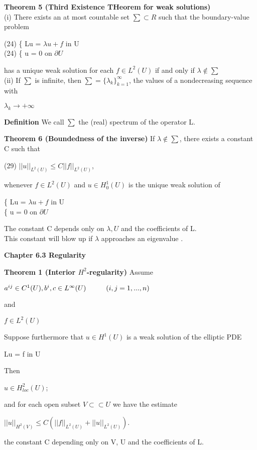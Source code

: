\documentclass{article}
\newcommand\tab[1][1cm]{\hspace*{#1}}
\begin{document}
\textbf {Theorem 5 (Third Existence THeorem for weak solutions) } \\
\tab (i) There exists an at most countable set $\sum \subset R$ such that the boundary-value problem 
\begin{center}
(24) \tab \{ Lu = $\lambda u + f$ \tab in U \\
(24) \tab \{ u = 0 \tab on $\partial U$
\end{center}
has a unique weak solution for each $f \in L^2(U)$ if and only if $\lambda \notin \sum$ \\ (ii) If $\sum$ is infinite, then $\sum = \{\lambda_k\}_{k=1}^{\infty}$, the values of a nondecreasing sequence with 
\begin{center}
$\lambda_k \to + \infty$
\end{center}

\textbf {Definition} We call $\sum$ the (real) spectrum of the operator L.

\textbf {Theorem 6 (Boundedness of the inverse)} If $\lambda \notin \sum$, there exists a constant C such that 
\begin{center}
(29) \tab $||u||_{L^{2}(U)} \leq C||f||_{L^{2}(U)}$,
\end{center}
whenever $f \in L^2(U)$ and $u \in H_0^{1}(U)$ is the unique weak solution of
\begin{center}
\{ Lu = $\lambda u + f$ \tab in U \\
\{ u = 0 \tab on $\partial U$
\end{center}
The constant C depends only on $\lambda, U$ and the coefficients of L. \\
This constant will blow up if $\lambda$ approaches an eigenvalue .


\textbf {Chapter 6.3 Regularity}

\textbf {Theorem 1 (Interior $H^2$-regularity)} Assume \begin{center}
$a^{ij} \in C^1 (U), b^i, c \in L^{\infty} (U) \tab  (i, j = 1,..., n)$
\end{center}
and 
\begin{center}
$f \in L^2 (U)$
\end{center}
Suppose furthermore that $u \in H^1 (U)$ is a weak solution of the elliptic PDE
\begin{center}
Lu = f \tab in U
\end{center}
Then
\begin{center}
$u \in H_{loc}^2 (U)$;
\end{center}
and for each open subset $V \subset \subset U$ we have the estimate 
\begin{center}
$||u||_{H^{2}(V)} \leq C(||f||_{L^{2}(U)} + ||u||_{L^{2}(U)})$.
\end{center}
the constant C depending only on V, U and the coefficients of L.
\end{document}
